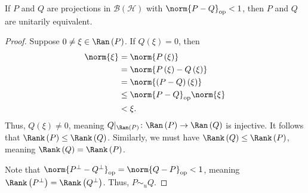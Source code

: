 \documentclass[10pt]{mypackage}
\begin{document}
\begin{fact}
  If $P$ and $Q$ are projections in $\mathcal{B}\left(\mathcal{H}\right)$ with $\norm{P-Q}_{\text{op}} < 1$, then $P$ and $Q$ are unitarily equivalent.
\end{fact}
\begin{proof}
  Suppose $0\neq \xi\in \Ran\left(P\right)$. If $Q\left(\xi\right) = 0$, then
  \begin{align*}
    \norm{\xi} &= \norm{P\left(\xi\right)}\\
               &= \norm{P\left(\xi\right) - Q\left(\xi\right)}\\
               &= \norm{\left(P-Q\right)\left(\xi\right)}\\
               &\leq \norm{P-Q}_{\text{op}} \norm{\xi}\\
               & < \xi.
  \end{align*}
  Thus, $Q\left(\xi\right) \neq 0$, meaning $Q|_{\Ran\left(P\right)}\colon \Ran\left(P\right)\rightarrow \Ran\left(Q\right)$ is injective. It follows that $\Rank\left(P\right) \leq \Rank\left(Q\right)$. Similarly, we must have $\Rank\left(Q\right) \leq \Rank\left(P\right)$, meaning $\Rank\left(Q\right) = \Rank\left(P\right)$.\newline

  Note that $\norm{P^{\perp} - Q^{\perp}}_{\text{op}} = \norm{Q - P}_{\text{op}} < 1$, meaning $\Rank\left(P^{\perp}\right) = \Rank\left(Q^{\perp}\right)$. Thus, $P\sim_{u}Q$.
\end{proof}
\end{document}

